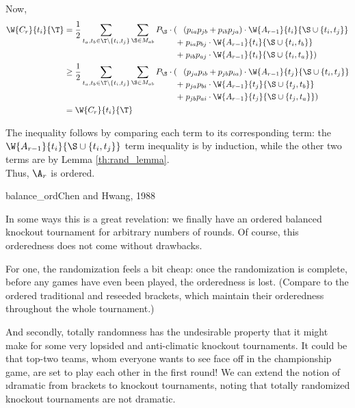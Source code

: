 {{        Now,
        \begin{align*}
            \W{C_r}{t_i}{\T} &=
                \frac{1}{2}\sum_{t_a, t_b \in \T \setminus \{t_i, t_j\}} \sum_{\S \in M_{ab}} P_\S \cdot (
                \begin{aligned}[t]
                    &(p_{ia}p_{jb} + p_{ib}p_{ja}) \cdot \W{A_{r-1}}{t_i}{\S \cup \{t_i, t_j\}}\\
                    +&\;p_{ia}p_{bj} \cdot \W{A_{r-1}}{t_i}{\S \cup \{t_i, t_b\}}\\
                    +&\;p_{ib}p_{aj} \cdot \W{A_{r-1}}{t_i}{\S \cup \{t_i, t_a\}})
                \end{aligned}
                \\
            &\geq
                \frac{1}{2}\sum_{t_a, t_b \in \T \setminus \{t_i, t_j\}} \sum_{\S \in M_{ab}} P_\S \cdot (
                \begin{aligned}[t]
                    &(p_{ja}p_{ib} + p_{jb}p_{ia}) \cdot \W{A_{r-1}}{t_j}{\S \cup \{t_i, t_j\}}\\
                    +&\;p_{ja}p_{bi} \cdot \W{A_{r-1}}{t_j}{\S \cup \{t_j, t_b\}}\\
                    +&\;p_{jb}p_{ai} \cdot \W{A_{r-1}}{t_j}{\S \cup \{t_j, t_a\}})
                \end{aligned}
                \\
            &=\W{C_r}{t_i}{\T}
        \end{align*}

        The inequality follows by comparing each term to its corresponding term: the $\W{A_{r-1}}{t_i}{\S \cup \{t_i, t_j\}}$ term inequality is by induction, while the other two terms are by Lemma \ref{th:rand_lemma}.\\

        Thus, $\A_r$ is ordered.
    }{balance_ord}{Chen and Hwang, 1988}
    
    In some ways this is a great revelation: we finally have an ordered balanced knockout tournament for arbitrary numbers of rounds. Of course, this orderedness does not come without drawbacks.
    
    For one, the randomization feels a bit cheap: once the randomization is complete, before any games have even been played, the orderedness is lost. (Compare to the ordered traditional and reseeded brackets, which maintain their orderedness throughout the whole tournament.)
    
    And secondly, totally randomness has the undesirable property that it might make for some very lopsided and anti-climatic knockout tournaments. It could be that top-two teams, whom everyone wants to see face off in the championship game, are set to play each other in the first round! We can extend the notion of \i{dramatic} from brackets to knockout tournaments, noting that totally randomized knockout tournaments are not dramatic.

}
